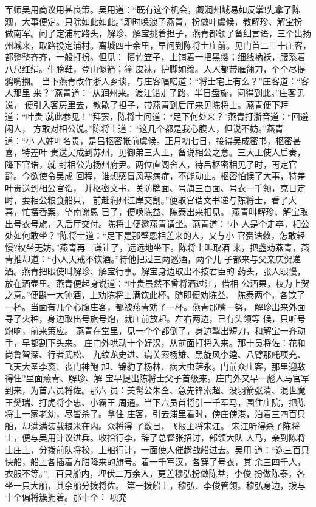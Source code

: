 军师吴用商议用甚良策。吴用道：“既有这个机会，觑润州城易如反掌!先拿了陈
观，大事便定。只除如此如此。”即时唤浪子燕青，扮做叶虞候，教解珍、解宝扮
做南军。问了定浦村路头，解珍、解宝挑着担子，燕青都领了备细言语，三个出扬
州城来，取路投定浦村。离城四十余里，早问到陈将士庄前。见门首二三十庄客，
都整整齐齐，一般打扮。但见：
攒竹笠子，上铺着一把黑缨；细线衲袄，腰系着八尺红绢。牛膀鞋，登山似箭；獐
皮袜，护脚如绵。人人都带雁翎刀，个个尽提鸦嘴搠。
当下燕青改作浙人乡谈，与庄客唱喏道：“将士宅上有么？”庄客道：“客人那里
来？”燕青道：“从润州来。渡江错走了路，半日盘旋，问得到此。”庄客见说，
便引入客房里去，教歇了担子，带燕青到后厅来见陈将士。燕青便下拜道：“叶贵
就此参见！”拜罢，陈将士问道：“足下何处来？”燕青打浙音道：“回避闲人，
方敢对相公说。”陈将士道：“这几个都是我心腹人，但说不妨。”燕青道：“小
人姓叶名贵，是吕枢密帐前虞候。正月初七日，接得吴成密书，枢密甚喜，特差叶
贵送吴成到苏州，见御弟三大王，备说相公之意。三大王使人启奏，降下官诰，就
封相公为扬州府尹。两位直阁舍人，待吕枢密相见了时，再定官爵。今欲使令吴成
回程，谁想感冒风寒病症，不能动止。枢密怕误了大事，特差叶贵送到相公官诰，
并枢密文书、关防牌面、号旗三百面、号衣一千领，克日定时，要相公粮食船只，
前赴润州江岸交割。”便取官诰文书递与陈将士，看了大喜，忙摆香案，望南谢恩
已了，便唤陈益、陈泰出来相见。
燕青叫解珍、解宝取出号衣号旗，入后厅交付。陈将士便邀燕青请坐。燕青道：“小
人是个走卒，相公处如何敢坐？”陈将士道：“足下是那壁恩相差来的人，又与小
官赍诰敕，怎敢轻慢?权坐无妨。”燕青再三谦让了，远远地坐下。陈将士叫取酒
来，把盏劝燕青，燕青推却道：“小人天戒不饮酒。”待他把过三两巡酒，两个儿
子都来与父亲庆贺递酒。燕青把眼使叫解珍、解宝行事。解宝身边取出不按君臣的
药头，张人眼慢，放在酒壶里。燕青便起身说道：“叶贵虽然不曾将酒过江，借相
公酒果，权为上贺之意。”便斟一大钟酒，上劝陈将士满饮此杯。随即便劝陈益、
陈泰两个，各饮了一杯。当面有几个心腹庄客，都被燕青劝了一杯。燕青那嘴一努，
解珍出来外面寻了火种，身边取出号旗号炮，就庄前放起。左右两边，已有头领等
候，只听号炮响，前来策应。
燕青在堂里，见一个个都倒了，身边掣出短刀，和解宝一齐动手，早都割下头来。
庄门外哄动十个好汉，从前面打将入来。那十员将佐：花和尚鲁智深、行者武松、
九纹龙史进、病关索杨雄、黑旋风李逵、八臂那吒项充、飞天大圣李衮、丧门神鲍
旭、锦豹子杨林、病大虫薛永。门前众庄客，那里迎敌得住?里面燕青、解珍、解
宝早提出陈将士父子首级来。庄门外又早一彪人马官军到来，为首六员将佐。那六
员：美髯公朱仝、急先锋索超、没羽箭张清、混世魔王樊瑞、打虎将李忠、小霸王
周通。当下六员首将引一千军马，围住庄院，把陈将士一家老幼，尽皆杀了。拿住
庄客，引去浦里看时，傍庄傍港，泊着三四百只船，却满满装载粮米在内。众将得
了数目，飞报主将宋江。
宋江听得杀了陈将士，便与吴用计议进兵。收拾行李，辞了总督张招讨，部领大队
人马，亲到陈将士庄上，分拨前队将校，上船行计，一面使人催趱战船过去。吴用
道：“选三百只快船，船上各插着方腊降来的旗号。着一千军汉，各穿了号衣，其
余三四千人，衣服不等。”三百只船内，埋伏二万余人，更差穆弘扮做陈益，李俊
扮做陈泰，各坐一只大船，其余船分拨将佐。
第一拨船上，穆弘、李俊管领。穆弘身边，拨与十个偏将簇拥着。那十个：
项充

